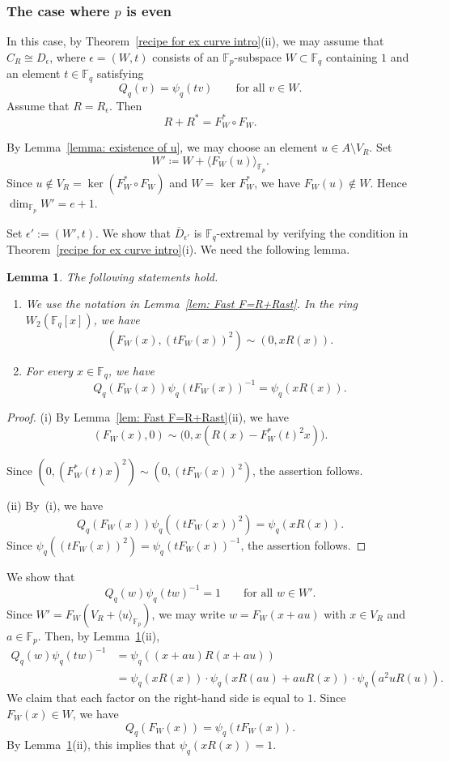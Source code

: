 \documentclass[12pt,a4paper]{amsart}
\newtheorem{lemma}[theorem]{Lemma}
\theoremstyle{definition}
\def\F{{\mathbb F}}
\theoremstyle{remark}
\begin{document}
\subsubsection{The case where $p$ is even}\label{import}
In this case, by Theorem~\ref{recipe for ex curve intro}(ii), we may assume that
$C_R\cong D_\epsilon$, where $\epsilon=(W,t)$ consists of an
$\F_p$-subspace $W\subset \F_q$ containing $1$ and an element
$t\in\F_q$ satisfying
\[
Q_q(v)=\psi_q(tv)\qquad\text{for all }v\in W.
\]
Assume that $R=R_\epsilon$.
Then
\[
R+R^\ast=F_W^\ast\circ F_W.
\]


By Lemma~\ref{lemma: existence of u}, we may choose an element $u\in A\setminus V_R$. 
Set \[
W'\coloneqq W+\langle{F_W(u)}\rangle_{\F_p}.
\]
Since $u\notin V_R=\ker (F_W^\ast \circ F_W)$ and 
$W=\ker F_W^\ast$, we have 
$F_W(u) \not\in W$. Hence 
$\dim_{\F_p} W'=e+1$.

Set $\epsilon':=(W',t)$. We show that $\overline{D}_{\epsilon'}$ is $\F_q$-extremal by verifying the condition in
Theorem~\ref{recipe for ex curve intro}(i). We need the following lemma. 
\begin{lemma}\label{lemma: F,tF sim  xRx}
The following statements hold. 
\begin{enumerate}
    \item We use the notation in Lemma~\ref{lem: Fast F=R+Rast}. In the ring $W_2(\F_q[x])$, we have 
    \[
    \left(F_W(x),(tF_W(x))^2\right)\sim (0,xR(x)). 
    \]
    \item For every $x\in \F_q$, we have 
    \[
Q_q(F_W(x))\psi_q(tF_W(x))^{-1}=\psi_q(xR(x)). 
    \]
\end{enumerate}
\end{lemma}
\begin{proof}
    (i) By Lemma~\ref{lem: Fast F=R+Rast}(ii), we have 
\[
(F_W(x),0)\sim\bigl(0,x(R(x)-F_W^\ast(t)^2x)\bigr). 
\]

Since $(0,(F_W^\ast(t) x)^2) \sim (0,(t F_W(x))^2)$, the assertion follows. 

\noindent
(ii) By~(i), we have 
\[
Q_q(F_W(x))\psi_q((tF_W(x))^2)=\psi_q(xR(x)).
\]
Since $\psi_q((tF_W(x))^2)=\psi_q(tF_W(x))^{-1}$, the assertion follows. 
\end{proof}

We show that 
\begin{equation}\label{equation: Qqw}
Q_q(w)\psi_q(tw)^{-1}=1\qquad\text{for all }w\in W'. 
\end{equation}
Since $W'=F_W(V_R+\langle u\rangle_{\F_p})$, we may write $w=F_W(x+au)$ with $x\in V_R$ and $a\in \F_p$. Then, by Lemma~\ref{lemma: F,tF sim  xRx}(ii), 
\begin{align*} Q_q(w)\psi_q(tw)^{-1}&=\psi_q((x+au)R(x+au))\\&=\psi_q(xR(x))\cdot\psi_q(xR(au)+auR(x))\cdot\psi_q(a^2uR(u)).
\end{align*}
We claim that each factor on the right-hand side is equal to $1$. 
Since $F_W(x)\in W$, we have 
\[
Q_q(F_W(x))=\psi_q(tF_W(x)). 
\]
By Lemma~\ref{lemma: F,tF sim  xRx}(ii), this implies that  $\psi_q(xR(x))=1$. 
\end{document}
